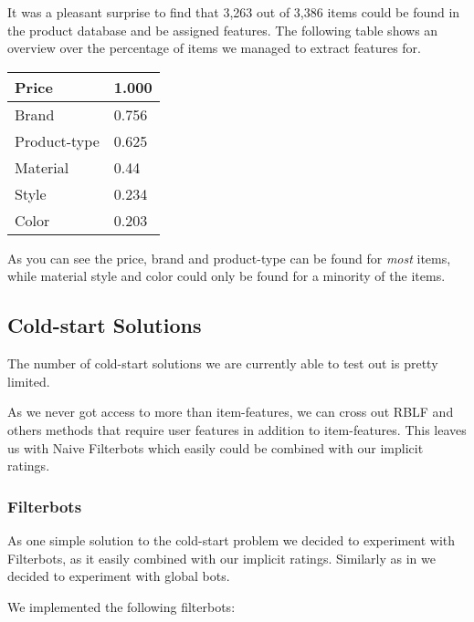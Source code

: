 It was a pleasant surprise to find that 3,263 out of 3,386 items could be found in the
product database and be assigned features. The following table shows an overview over the percentage of items we managed to extract features for.

\begin{table}
\begin{tabular}{|l|l|}
Price 			& 1.000 \\ \hline
Brand 			& 0.756 \\ \hline
Product-type 	& 0.625 \\ \hline
Material 		& 0.44  \\ \hline
Style 			& 0.234 \\ \hline
Color 			& 0.203 \\ \hline
\end{tabular}
\end{table}

As you can see the price, brand and product-type can be found for \emph{most} items, while material style and color could only be found for a minority of the items.



\subsection{Cold-start Solutions}


The number of cold-start solutions we are currently able to test out is pretty limited.

As we never got access to more than item-features, we can cross out RBLF and others
methods that require user features in addition to item-features. This leaves us with
Naive Filterbots \cite{Park2006} which easily could be combined with our implicit ratings.

\subsubsection{Filterbots}

As one simple solution to the cold-start problem we decided to experiment with Filterbots, as it easily
combined with our implicit ratings. Similarly as in \cite{Park2006} we decided to experiment with global bots.

We implemented the following filterbots:

